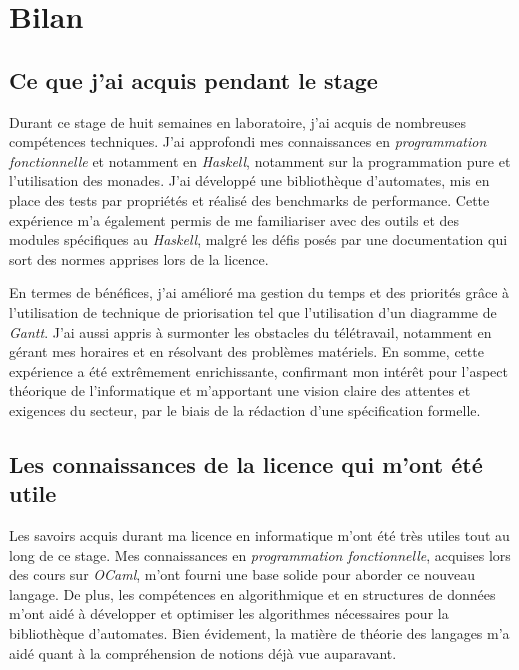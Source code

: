 \section{Bilan}

\subsection{Ce que j'ai acquis pendant le stage}

Durant ce stage de huit semaines en laboratoire, j'ai acquis de nombreuses 
compétences techniques. J'ai approfondi mes connaissances en 
\textit{programmation fonctionnelle} et notamment en \textit{Haskell}, notamment 
sur la programmation pure et l'utilisation des monades. J'ai développé une 
bibliothèque d'automates, mis en place des tests par propriétés et réalisé des 
benchmarks de performance. Cette expérience m'a également permis de me 
familiariser avec des outils et des modules spécifiques au \textit{Haskell}, 
malgré les défis posés par une documentation qui sort des normes apprises lors 
de la licence. 

\vphantom{}

En termes de bénéfices, j'ai amélioré ma gestion du temps et des priorités grâce 
à l'utilisation de technique de priorisation tel que l'utilisation d'un 
diagramme de \textit{Gantt}. J'ai aussi appris à surmonter les obstacles du 
télétravail, notamment en gérant mes horaires et en résolvant des problèmes 
matériels. En somme, cette expérience a été extrêmement enrichissante, 
confirmant mon intérêt pour l'aspect théorique de l'informatique et m'apportant 
une vision claire des attentes et exigences du secteur, par le biais de la 
rédaction d'une spécification formelle.

\subsection{Les connaissances de la licence qui m'ont été utile}

Les savoirs acquis durant ma licence en informatique m'ont été très utiles tout 
au long de ce stage. Mes connaissances en \textit{programmation fonctionnelle}, 
acquises lors des cours sur \textit{OCaml}, m'ont fourni une base solide pour 
aborder ce nouveau langage. De plus, les compétences en algorithmique et en 
structures de données m'ont aidé à développer et optimiser les algorithmes 
nécessaires pour la bibliothèque d'automates. Bien évidement, la matière de 
théorie des langages m’a aidé quant à la compréhension de notions déjà vue 
auparavant.

